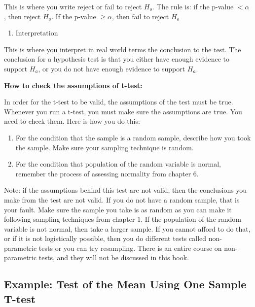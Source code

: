 \documentclass[
]{book}
\providecommand{\tightlist}{%
  \setlength{\itemsep}{0pt}\setlength{\parskip}{0pt}}
\begin{document}
This is where you write reject or fail to reject \(H_o\). The rule is: if the p-value \(<\alpha\) , then reject \(H_o\). If the p-value \(\ge \alpha\), then fail to reject \(H_o\)

\begin{enumerate}
\def\labelenumi{\arabic{enumi}.}
\setcounter{enumi}{5}
\tightlist
\item
  Interpretation
\end{enumerate}

This is where you interpret in real world terms the conclusion to the test. The conclusion for a hypothesis test is that you either have enough evidence to support \(H_a\), or you do not have enough evidence to support \(H_a\).

\textbf{How to check the assumptions of t-test:}

In order for the t-test to be valid, the assumptions of the test must be true. Whenever you run a t-test, you must make sure the assumptions are true. You need to check them. Here is how you do this:

\begin{enumerate}
\def\labelenumi{\arabic{enumi}.}
\item
  For the condition that the sample is a random sample, describe how you took the sample. Make sure your sampling technique is random.
\item
  For the condition that population of the random variable is normal, remember the process of assessing normality from chapter 6.
\end{enumerate}

Note: if the assumptions behind this test are not valid, then the conclusions you make from the test are not valid. If you do not have a random sample, that is your fault. Make sure the sample you take is as random as you can make it following sampling techniques from chapter 1. If the population of the random variable is not normal, then take a larger sample. If you cannot afford to do that, or if it is not logistically possible, then you do different tests called non-parametric tests or you can try resampling. There is an entire course on non-parametric tests, and they will not be discussed in this book.

\hypertarget{example-test-of-the-mean-using-one-sample-t-test}{%
\subsection{Example: Test of the Mean Using One Sample T-test}\label{example-test-of-the-mean-using-one-sample-t-test}}
\end{document}
